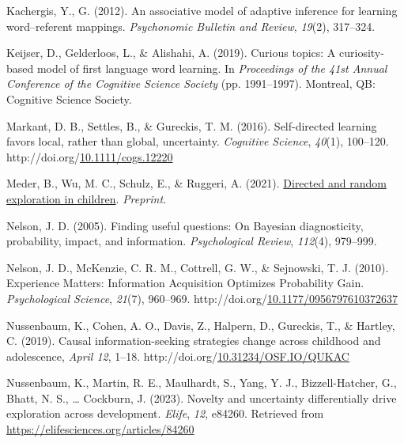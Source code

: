 \documentclass[10pt, letterpaper]{article}
\newenvironment{CSLReferences}%
  {}%
  {\par}
\begin{document}
\begin{CSLReferences}
Kachergis, Y., G. (2012). An associative model of adaptive inference for
learning word--referent mappings. \emph{Psychonomic Bulletin and
Review}, \emph{19}(2), 317--324.

Keijser, D., Gelderloos, L., \& Alishahi, A. (2019). Curious topics: {A}
curiosity-based model of first language word learning. In
\emph{Proceedings of the 41st {Annual} {Conference} of the {Cognitive}
{Science} {Society}} (pp. 1991--1997). Montreal, QB: Cognitive Science
Society.

Markant, D. B., Settles, B., \& Gureckis, T. M. (2016). Self-directed
learning favors local, rather than global, uncertainty. \emph{Cognitive
Science}, \emph{40}(1), 100--120.
http://doi.org/\href{https://doi.org/10.1111/cogs.12220}{10.1111/cogs.12220}

Meder, B., Wu, M. C., Schulz, E., \& Ruggeri, A. (2021).
\href{https://www.ncbi.nlm.nih.gov/pubmed/25246403}{Directed and random
exploration in children}. \emph{Preprint}.

Nelson, J. D. (2005). Finding useful questions: {On} {Bayesian}
diagnosticity, probability, impact, and information. \emph{Psychological
Review}, \emph{112}(4), 979--999.

Nelson, J. D., McKenzie, C. R. M., Cottrell, G. W., \& Sejnowski, T. J.
(2010). Experience {Matters}: {Information} {Acquisition} {Optimizes}
{Probability} {Gain}. \emph{Psychological Science}, \emph{21}(7),
960--969.
http://doi.org/\href{https://doi.org/10.1177/0956797610372637}{10.1177/0956797610372637}

Nussenbaum, K., Cohen, A. O., Davis, Z., Halpern, D., Gureckis, T., \&
Hartley, C. (2019). Causal information-seeking strategies change across
childhood and adolescence,\emph{ April 12}, 1--18.
http://doi.org/\href{https://doi.org/10.31234/OSF.IO/QUKAC}{10.31234/OSF.IO/QUKAC}

Nussenbaum, K., Martin, R. E., Maulhardt, S., Yang, Y. J.,
Bizzell-Hatcher, G., Bhatt, N. S., \ldots{} Cockburn, J. (2023). Novelty
and uncertainty differentially drive exploration across development.
\emph{Elife}, \emph{12}, e84260. Retrieved from
\url{https://elifesciences.org/articles/84260}


\end{CSLReferences}
\end{document}
